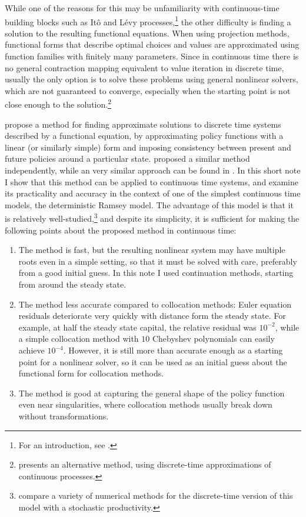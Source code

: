 \documentclass[a4paper,11pt]{article}
\begin{document}
While one of the reasons for this may be unfamiliarity with continuous-time building blocks such as Itô and Lévy processes,\footnote{For an introduction, see \textcite{oksendal2005applied}.} the other difficulty is finding a solution to the resulting functional equations. When using projection methods, functional forms that describe optimal choices and values are approximated using function families with finitely many parameters. Since in continuous time there is no general contraction mapping equivalent to value iteration in discrete time, usually the only option is to solve these problems using general nonlinear solvers, which are not guaranteed to converge, especially when the starting point is not close enough to the solution.\footnote{\textcite{kushner2013numerical} presents an alternative method, using discrete-time approximations of continuous processes.}

\textcite{den2015exact} propose a method for finding approximate solutions to discrete time systems described by a functional equation, by approximating policy functions with a linear (or similarly simple) form and imposing consistency between present and future policies around a particular state. \textcite{levintal2016taylor} proposed a similar method independently, while an very similar approach can be found in \textcite[Appendix B]{krusell2002equilibrium}. In this short note I show that this method can be applied to continuous time systems, and examine its practicality and accuracy in the context of one of the simplest continuous time models, the deterministic Ramsey model. The advantage of this model is that it is relatively well-studied,\footnote{\textcite{aruoba2006comparing} compare a variety of numerical methods for the discrete-time version of this model with a stochastic productivity.} and despite its simplicity, it is sufficient for making the following points about the proposed method in continuous time:
\begin{enumerate}
\item The method is fast, but the resulting nonlinear system may have multiple roots even in a simple setting, so that it must be solved with care, preferably from a good initial guess. In this note I used continuation methods, starting from around the steady state.
\item The method less accurate compared to collocation methods: Euler equation residuals deteriorate very quickly with distance form the steady state. For example, at half the steady state capital, the relative residual was $10^{-2}$, while a simple collocation method with $10$ Chebyshev polynomials can easily achieve $10^{-4}$. However, it is still more than accurate enough as a starting point for a nonlinear solver, so it can be used as an initial guess about the functional form for collocation methods.
\item The method is good at capturing the general shape of the policy function even near singularities, where collocation methods usually break down without transformations.
\end{enumerate}
\end{document}
